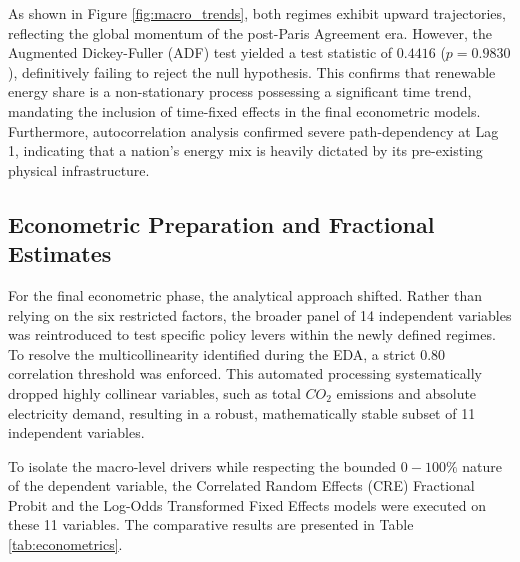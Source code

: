 \documentclass[a4paper,11pt]{article}
\begin{document}
As shown in Figure \ref{fig:macro_trends}, both regimes exhibit upward trajectories, reflecting the global momentum of the post-Paris Agreement era.
However, the Augmented Dickey-Fuller (ADF) test yielded a test statistic of $0.4416$ ($p=0.9830$), definitively failing to reject the null hypothesis.
This confirms that renewable energy share is a non-stationary process possessing a significant time trend, mandating the inclusion of time-fixed effects in the final econometric models.
Furthermore, autocorrelation analysis confirmed severe path-dependency at Lag 1, indicating that a nation's energy mix is heavily dictated by its pre-existing physical infrastructure.

\subsection{Econometric Preparation and Fractional Estimates}
For the final econometric phase, the analytical approach shifted.
Rather than relying on the six restricted factors, the broader panel of 14 independent variables was reintroduced to test specific policy levers within the newly defined regimes.
To resolve the multicollinearity identified during the EDA, a strict 0.80 correlation threshold was enforced.
This automated processing systematically dropped highly collinear variables, such as total $CO_2$ emissions and absolute electricity demand, resulting in a robust, mathematically stable subset of 11 independent variables.

To isolate the macro-level drivers while respecting the bounded $0-100\%$ nature of the dependent variable, the Correlated Random Effects (CRE) Fractional Probit and the Log-Odds Transformed Fixed Effects models were executed on these 11 variables.
The comparative results are presented in Table \ref{tab:econometrics}.
\end{document}
